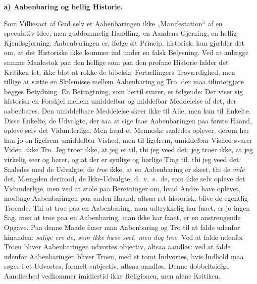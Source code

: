 \documentclass[12pt]{book}
\newcommand{\runhead}[1]{%
  \medskip\begin{center}{\bfseries #1}\end{center}\medskip}
\begin{document}
\runhead{a) Aabenbaring og hellig Historie.}

Som Villiesact af Gud selv er Aabenbaringen ikke „Manifestation“ af
en speculativ Idee, men guddommelig Handling, en Aandens Gjerning,
en hellig Kjendsgjerning. Aabenbaringen er, ifølge sit Princip,
historisk; kun gjælder det om, at det Historiske ikke kommer ind
under en falsk Belysning. Ved at anlægge samme Maalestok paa den
hellige som paa den profane Historie falder det Kritiken let, ikke
blot at rokke de bibelske Fortællingers Troværdighed, men tillige at
sætte en Skilsmisse mellem Aabenbaring og Tro, der maa tilintetgjøre
begges Betydning. En Betragtning, som hertil svarer, er følgende:
Der viser sig historisk en Forskjel mellem umiddelbar og middelbar
Meddelelse af det, der aabenbares. Den umiddelbare Meddelelse skeer
ikke til Alle, men kun til Enkelte. Disse Enkelte, de Udvalgte, der
saa at sige faae Aabenbaringen paa første Haand, opleve selv det
Vidunderlige. Men hvad et Menneske saaledes oplever, derom har han
jo en ligefrem umiddelbar Vished, men til ligefrem, umiddelbar
Vished svarer Viden, ikke Tro. Jeg troer ikke, at jeg er til, thi
jeg veed det; jeg troer ikke, at jeg virkelig seer og hører, og at
der er synlige og hørlige Ting til, thi jeg veed det. Saaledes med
de Udvalgte; de \emph{troe} ikke, at en Aabenbaring er skeet, thi de
\emph{vide} det. Mængden derimod, de Ikke-Udvalgte, d.\ v.\ s.\ de,
som ikke selv opleve det Vidunderlige, men ved at stole paa
Beretninger om, hvad Andre have oplevet, modtage Aabenbaringen paa
anden Haand,
altsaa ret historisk, blive de egentlig Troende. Thi at troe paa en
Aabenbaring, man udtrykkelig har faaet, er jo ingen Sag, men at troe
paa en Aabenbaring, man ikke har faaet, er en anstrengende Opgave.
Paa denne Maade faaer man Aabenbaring og Tro til at falde udenfor
hinanden: \emph{salige ere de, som ikke have seet, men dog troe}.
Ved at falde udenfor Troen bliver Aabenbaringen udvortes objectiv,
altsaa aandløs: ved at falde udenfor Aabenbaringen bliver Troen, med
et tomt Indvortes, hvis Indhold maa søges i et Udvortes, formelt
subjectiv, altsaa aandløs. Denne dobbeltsidige Aandløshed vedkommer
imidlertid ikke Religionen, men alene Kritiken.
\end{document}
